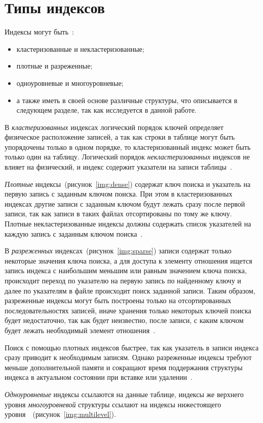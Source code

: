 \section{Типы индексов}

Индексы могут быть~\cite{ship}:
\begin{itemize}
    \item кластеризованные и некластеризованные;
    \item плотные и разреженные;
    \item одноуровневые и многоуровневые;
    \item а также иметь в своей основе различные структуры, что описывается в
        следующем разделе, так как исследуется в данной работе.
\end{itemize}

 В \textit{кластеризованных} индексах логический порядок ключей определяет
 физическое расположение записей, а так как строки в таблице могут быть
 упорядочены только в одном порядке, то кластеризованный индекс может быть
 только один на таблицу. Логический порядок \textit{некластеризованных} индексов
 не влияет на физический, и индекс содержит указатели на записи
 таблицы~\cite{osip}.

\textit{Плотные} индексы~(рисунок~\ref{img:dense}) содержат ключ поиска и
указатель на первую запись с заданным ключом поиска. При этом в кластеризованных
индексах другие записи с заданным ключом будут лежать сразу после первой записи,
так как записи в таких файлах отсортированы по тому же ключу. Плотные
некластеризованные индексы должны содержать список указателей на каждую запись с
заданным ключом поиска~\cite{ship}.
 

В \textit{разреженных} индексах~(рисунок~\ref{img:sparse}) записи содержат
только некоторые значения ключа поиска, а для доступа к элементу отношения
ищется запись индекса с наибольшим меньшим или равным значением ключа поиска,
происходит переход по указателю на первую запись по найденному ключу и далее по
указателям в файле происходит поиск заданной записи. Таким образом, разреженные
индексы могут быть построены только на отсортированных последовательностях
записей, иначе хранения только некоторых ключей поиска будет недостаточно, так
как будет неизвестно, после записи, с каким ключом будет лежать необходимый
элемент отношения~\cite{ship}.


Поиск с помощью плотных индексов быстрее, так как указатель в записи индекса
сразу приводит к необходимым записям. Однако разреженные индексы требуют меньше
дополнительной памяти и сокращают время поддержания структуры индекса в
актуальном состоянии при вставке или удалении~\cite{ship}.

\textit{Одноуровневые} индексы ссылаются на данные таблице, индексы же верхнего уровня \textit{многоуровневой} структуры ссылают на индексы нижестоящего
уровня~\cite{ship}~(рисунок~\ref{img:multilevel}).


